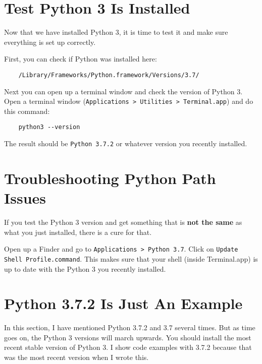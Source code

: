 \section{Test Python 3 Is Installed}

Now that we have installed Python 3, it is time to test it and
make sure everything is set up correctly.

First, you can check if Python was installed here:

\begin{verbatim}
    /Library/Frameworks/Python.framework/Versions/3.7/
\end{verbatim}

Next you can open up a terminal window and check the version
of Python 3. Open a terminal window (\texttt{Applications > Utilities > Terminal.app})
and do this command:

\begin{verbatim}
    python3 --version
\end{verbatim}

The result should be \texttt{Python 3.7.2} or whatever version
you recently installed.

\section{Troubleshooting Python Path Issues}

If you test the Python 3 version and get something that is 
\textbf{not the same} as what you just installed, there is a cure for that.

Open up a Finder and go to \texttt{Applications > Python 3.7}. Click
on \texttt{Update Shell Profile.command}. This makes sure that your
shell (inside Terminal.app) is up to date with the Python 3 you
recently installed.

\section{Python 3.7.2 Is Just An Example}

In this section, I have mentioned Python 3.7.2 and 3.7 several times.
But as time goes on, the Python 3 versions will march upwards. You
should install the most recent stable version of Python 3. I show code
examples with 3.7.2 because that was the most recent version when I
wrote this.
